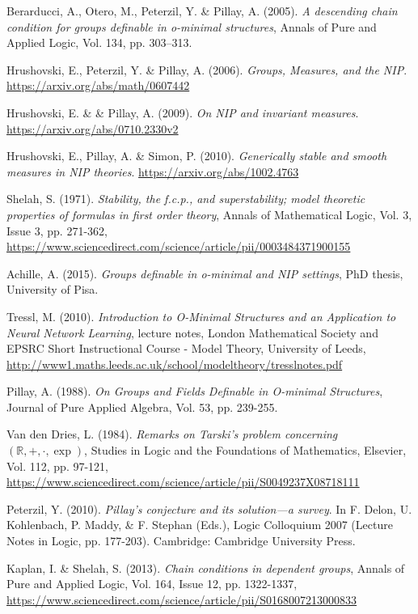 \documentclass[a4paper]{report}
\newcommand{\R}{\mathbb{R}}
\theoremstyle{definition}
\theoremstyle{remstyle}
\begin{document}
\begin{thebibliography}{100}
	 Berarducci, A., Otero, M., Peterzil, Y. \& Pillay, A. (2005). \emph{A descending chain condition for groups definable in o-minimal structures}, Annals of Pure and Applied Logic, Vol. 134, pp. 303–313.

	 Hrushovski, E., Peterzil, Y. \& Pillay, A. (2006). \emph{Groups, Measures, and the NIP}. \url{https://arxiv.org/abs/math/0607442}

	 Hrushovski, E. \& \& Pillay, A. (2009). \emph{On NIP and invariant measures}. \url{https://arxiv.org/abs/0710.2330v2}

	 Hrushovski, E., Pillay, A. \& Simon, P. (2010). \emph{Generically stable and smooth measures in NIP theories}. \url{https://arxiv.org/abs/1002.4763}

	 Shelah, S. (1971). \emph{Stability, the f.c.p., and superstability; model theoretic properties of formulas in first order theory}, Annals of Mathematical Logic, Vol. 3, Issue 3, pp. 271-362, \url{https://www.sciencedirect.com/science/article/pii/0003484371900155}

	 Achille, A. (2015). \emph{Groups definable in o-minimal and NIP settings}, PhD thesis, University of Pisa.

	 Tressl, M. (2010). \emph{Introduction to O-Minimal Structures and an Application to Neural Network Learning}, lecture notes, London Mathematical Society and EPSRC Short Instructional Course - Model Theory, University of Leeds, \url{http://www1.maths.leeds.ac.uk/school/modeltheory/tresslnotes.pdf}

	 Pillay, A. (1988). \emph{On Groups and Fields Definable in O-minimal Structures}, Journal of Pure Applied Algebra, Vol. 53, pp. 239-255.

	 Van den Dries, L. (1984). \emph{Remarks on Tarski's problem concerning $(\R, +, \cdot, \exp)$}, Studies in Logic and the Foundations of Mathematics, Elsevier,	Vol. 112, pp. 97-121, \url{https://www.sciencedirect.com/science/article/pii/S0049237X08718111}

	 Peterzil, Y. (2010). \emph{Pillay's conjecture and its solution—a survey}. In F. Delon, U. Kohlenbach, P. Maddy, \& F. Stephan (Eds.), Logic Colloquium 2007 (Lecture Notes in Logic, pp. 177-203). Cambridge: Cambridge University Press.

	 Kaplan, I. \& Shelah, S. (2013). \emph{Chain conditions in dependent groups}, Annals of Pure and Applied Logic, Vol. 164, Issue 12, pp. 1322-1337, \url{https://www.sciencedirect.com/science/article/pii/S0168007213000833}


\end{thebibliography}
\end{document}
